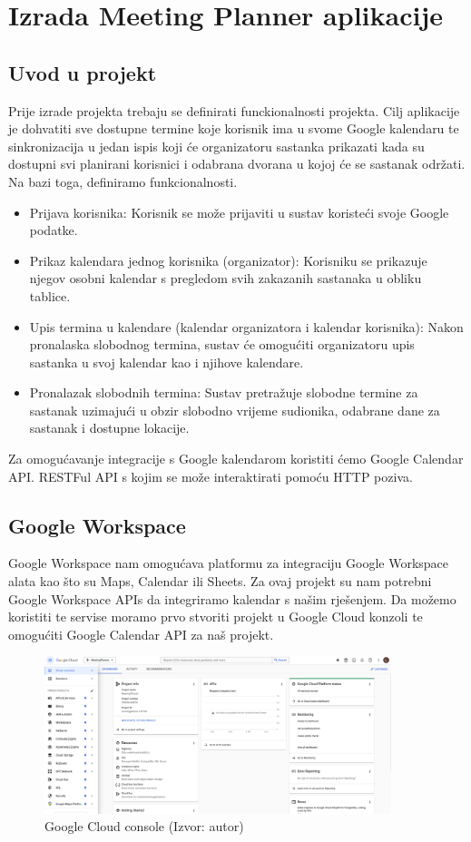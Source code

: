 \documentclass{foi}
\begin{document}
\chapter{Izrada Meeting Planner aplikacije}
\section{Uvod u projekt}
Prije izrade projekta trebaju se definirati funckionalnosti projekta. Cilj aplikacije je dohvatiti sve dostupne termine koje korisnik ima u svome Google kalendaru te sinkronizacija u jedan ispis koji će organizatoru sastanka prikazati kada su dostupni svi planirani korisnici i odabrana dvorana u kojoj će se sastanak održati. 
Na bazi toga, definiramo funkcionalnosti.
\begin{itemize}
    \item Prijava korisnika: Korisnik se može prijaviti u sustav koristeći svoje Google podatke.
    \item Prikaz kalendara jednog korisnika (organizator): Korisniku se prikazuje njegov osobni kalendar s pregledom svih zakazanih sastanaka u obliku tablice.
    \item Upis termina u kalendare (kalendar organizatora i kalendar korisnika): Nakon pronalaska slobodnog termina, sustav će omogućiti organizatoru upis sastanka u svoj kalendar kao i njihove kalendare.
    \item Pronalazak slobodnih termina: Sustav pretražuje slobodne termine za sastanak uzimajući u obzir slobodno vrijeme sudionika, odabrane dane za sastanak i dostupne lokacije.
\end{itemize}
Za omogućavanje integracije s Google kalendarom koristiti ćemo Google Calendar API. RESTFul API s kojim se može interaktirati pomoću HTTP poziva.
\section{Google Workspace}
Google Workspace nam omogućava platformu za integraciju Google Workspace alata kao što su Maps, Calendar ili Sheets. Za ovaj projekt su nam potrebni Google Workspace APIs da integriramo kalendar s našim rješenjem.
Da možemo koristiti te servise moramo prvo stvoriti projekt u Google Cloud konzoli te omogućiti Google Calendar API za naš projekt.
\begin{figure}[H]
    \centering
    \includegraphics[width=0.9\textwidth]{slike/google_console.png}
    \caption{Google Cloud console (Izvor: autor)}
    \label{fig:google_console}
\end{figure}
\end{document}
